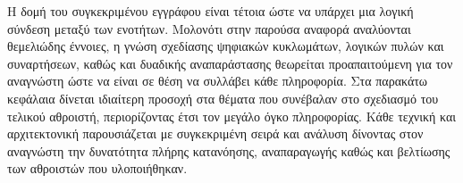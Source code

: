 Η δομή του συγκεκριμένου εγγράφου είναι τέτοια ώστε να υπάρχει μια λογική σύνδεση μεταξύ των ενοτήτων. Μολονότι στην παρούσα αναφορά αναλύονται θεμελιώδης έννοιες, η γνώση σχεδίασης ψηφιακών κυκλωμάτων, λογικών πυλών και συναρτήσεων, καθώς και δυαδικής αναπαράστασης θεωρείται προαπαιτούμενη για τον αναγνώστη ώστε να είναι σε θέση να συλλάβει κάθε πληροφορία. Στα παρακάτω κεφάλαια δίνεται ιδιαίτερη προσοχή στα θέματα που συνέβαλαν στο σχεδιασμό του τελικού αθροιστή, περιορίζοντας έτσι τον μεγάλο όγκο πληροφορίας. Κάθε τεχνική και αρχιτεκτονική παρουσιάζεται με συγκεκριμένη σειρά και ανάλυση δίνοντας στον αναγνώστη την δυνατότητα πλήρης κατανόησης, αναπαραγωγής καθώς και βελτίωσης των αθροιστών που υλοποιήθηκαν.